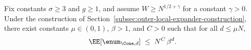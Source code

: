 %
%

\begin{theorem}
\label{thm:outer-local-expander-spectrum-safe}
Fix constants $\sigma\ge 3$ and $g\ge 1$, and assume $W\ge N^{1/2+\gamma}$ for a constant $\gamma>0$.
Under the construction of Section~\ref{subsec:outer-local-expander-construction}, there exist constants
$\mu\in(0,1)$, $\beta>1$, and $C>0$ such that for all $d\le \mu N$,
\[
\EE[\enum_{\Cone,d}] \;\le\; N^{C}\,\beta^{d}.
\]
\end{theorem}

